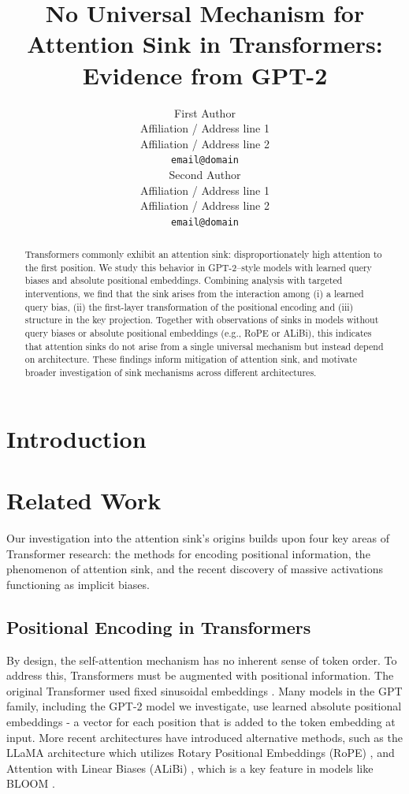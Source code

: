 \documentclass[11pt]{article}
\title{No Universal Mechanism for Attention Sink in Transformers: \\Evidence from GPT-2}
\author{First Author \\
  Affiliation / Address line 1 \\
  Affiliation / Address line 2 \\
  \texttt{email@domain} \\\And
  Second Author \\
  Affiliation / Address line 1 \\
  Affiliation / Address line 2 \\
  \texttt{email@domain} \\
}
\date{}
\newif\ifYRMcomments
\newcommand{\YTODO}[1]{\ifYRMcomments\textcolor{pink}{[TODO for Yuval: #1]}\fi}
\newcommand{\YRM}[1]{\ifYRMcomments\textcolor{red}{[YRM: #1]}\fi}
\begin{document}
\maketitle

\begin{abstract}
  Transformers commonly exhibit an attention sink: disproportionately high attention to the first position. We study this behavior in GPT-2–style models with learned query biases and absolute positional embeddings. Combining analysis with targeted interventions, we find that the sink arises from the interaction among (i) a learned query bias, (ii) the first-layer transformation of the positional encoding and (iii) structure in the key projection. Together with observations of sinks in models without query biases or absolute positional embeddings (e.g., RoPE or ALiBi), this indicates that attention sinks do not arise from a single universal mechanism but instead depend on architecture. These findings inform mitigation of attention sink, and motivate broader investigation of sink mechanisms across different architectures.
\end{abstract}

\section{Introduction}
\YTODO{Write an intro.}

\section{Related Work}
\YRM{I didn't look at this part yet, waiting for you to finish it fist :) } 

\YRM{As mentioned, this needs to be improved - By citing more, making this more concise (as concise as possible while including really vital info, and adding more in appendix if needed, like we did in our attention knockout paper )}Our investigation into the attention sink's origins builds upon four key areas of Transformer research: the methods for encoding positional information, the phenomenon of attention sink, and the recent discovery of massive activations functioning as implicit biases.

\subsection{Positional Encoding in Transformers}
By design, the self-attention mechanism has no inherent sense of token order. To address this, Transformers must be augmented with positional information. The original Transformer used fixed sinusoidal embeddings \citep{vaswani2017attention}. Many models in the GPT family, including the GPT-2 model we investigate, use learned absolute positional embeddings - a vector for each position that is added to the token embedding at input. More recent architectures have introduced alternative methods, such as the LLaMA architecture \citep{touvron2023llama2} which utilizes Rotary Positional Embeddings (RoPE) \citep{su2021roformer}, and Attention with Linear Biases (ALiBi) \citep{press2021train}, which is a key feature in models like BLOOM \citep{bigscience2023bloom}.
\end{document}
